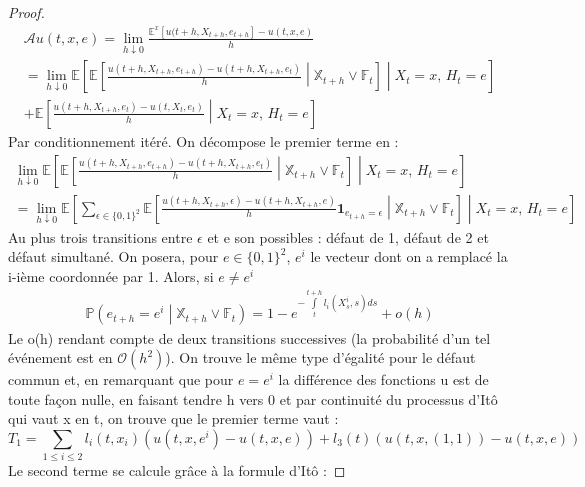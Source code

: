 \documentclass[a4paper]{article}
\theoremstyle{definition}
\theoremstyle{remark}
\begin{document}
\begin{proof}
\begin{multline*}
\mathcal{A}u(t,x,e) = \lim_{h\downarrow 0} \frac {\mathbb{E}^{x}\left[u(t+h, X_{t+h}, e_{t+h}\right] - u(t,x,e)}{h} \\
= \lim_{h\downarrow 0} \mathbb{E}\left[
\mathbb{E} \left[ \frac{u (t+h, X_{t+h}, e_{t+h}) - u(t+h, X_{t+h}, e_{t})}{h} \middle| \mathbb{X}_{t+h} \vee \mathbb{F}_{t}  \right] \middle| X_t = x, \, H_t = e \right] \\
 + \mathbb{E} \left[ \frac {u(t+h, X_{t+h}, e_{t}) -  u(t, X_{t}, e_{t})}{h} \middle| X_t = x, \, H_t = e \right]
\end{multline*}
Par conditionnement itéré. On décompose le premier terme en :
\begin{multline*}
\lim_{h\downarrow 0} \mathbb{E} \left[
\mathbb{E} \left[ \frac{u (t+h, X_{t+h}, e_{t+h}) - u(t+h, X_{t+h}, e_{t})}{h} \middle| \mathbb{X}_{t+h} \vee \mathbb{F}_{t}  \right] \middle| X_t = x, \, H_t = e \right] \\
=  \lim_{h\downarrow 0} \mathbb{E} \left[ \sum \limits_{\epsilon \in \lbrace 0, 1 \rbrace^{2}} \mathbb{E} \left[ \frac{u (t+h, X_{t+h}, \epsilon) - u(t+h, X_{t+h}, e)}{h} \mathbf{1}_{e_{t+h} = \epsilon} \middle| \mathbb{X}_{t+h} \vee \mathbb{F}_{t}  \right] \middle| X_t = x, \, H_t = e \right]
\end{multline*}
Au plus trois transitions entre $\epsilon$ et e son possibles : défaut de 1, défaut de 2 et défaut simultané. On posera, pour $e  \in \lbrace 0, 1 \rbrace^{2}$, $e^{i}$ le vecteur dont on a remplacé la i-ième coordonnée par 1. Alors, si $e \neq e^{i}$
\begin{eqnarray*}
\mathbb{P} \left(e_{t+h} = e^{i} \middle| \mathbb{X}_{t+h} \vee \mathbb{F}_{t}  \right) = 1 - e^{ -\int \limits_{t}^{t+h} l_{i} (X^{i}_{s}, s)ds} + o(h)
\end{eqnarray*}
Le o(h) rendant compte de deux transitions successives (la probabilité d'un tel événement est en $\mathcal{O} (h^2)$). On trouve le même type d'égalité pour le défaut commun et, en remarquant que pour $e = e^{i}$ la différence des fonctions u est de toute façon nulle, en faisant tendre h vers 0 et par continuité du processus d'Itô qui vaut x en t, on trouve que le premier terme vaut :
\begin{equation}
T_{1} = \sum \limits_{1 \leqslant i \leqslant 2} l_{i} (t, x_{i}) (u(t, x, e^{i}) - u(t, x, e)) + l_{3}(t)(u(t,x,(1,1)) - u(t,x,e))
\end{equation}
Le second terme se calcule grâce à la formule d'Itô :

\end{proof}
\end{document}
